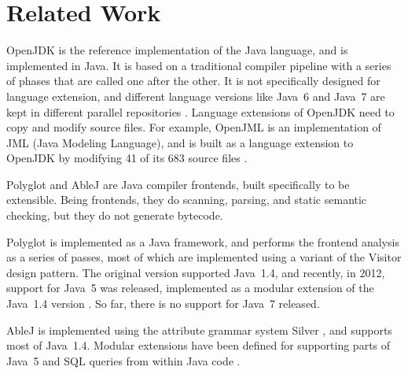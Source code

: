 {\section{Related Work}
\label{sec:related-work}


OpenJDK is the reference implementation of the Java language, and is implemented in Java. It is
based on a traditional compiler pipeline with a series of phases that are called one after the
other. It is not specifically designed for language extension, and different language versions like
Java~6 and Java~7 are kept in different parallel repositories \cite{openjdk6}. Language extensions of OpenJDK need to copy and modify source files. For example, OpenJML is an implementation of JML (Java Modeling Language), and is built as a language extension to OpenJDK by modifying 41 of its 683 source files \cite{cok2011openjml}.

Polyglot \cite{nystrom2003polyglot} and AbleJ \cite{VanWyk2007AbleJ} are Java compiler frontends, built specifically to be extensible. Being frontends, they do scanning, parsing, and static semantic checking, but they do not generate bytecode.

Polyglot is implemented as a Java framework, and performs the frontend analysis as a series of
passes, most of which are implemented using a variant of the Visitor design pattern. The original
version supported Java~1.4, and recently, in 2012, support for Java~5 was released, implemented as a
modular extension of the Java~1.4 version \cite{polyglot-web}. So far, there is no support for Java~7 released.

AbleJ is implemented using the attribute grammar system Silver \cite{Wyk2010Silver}, and supports
most of Java~1.4. Modular extensions have been defined for supporting parts of Java~5 and SQL queries from within Java code \cite{VanWyk2007AbleJ}.


}
